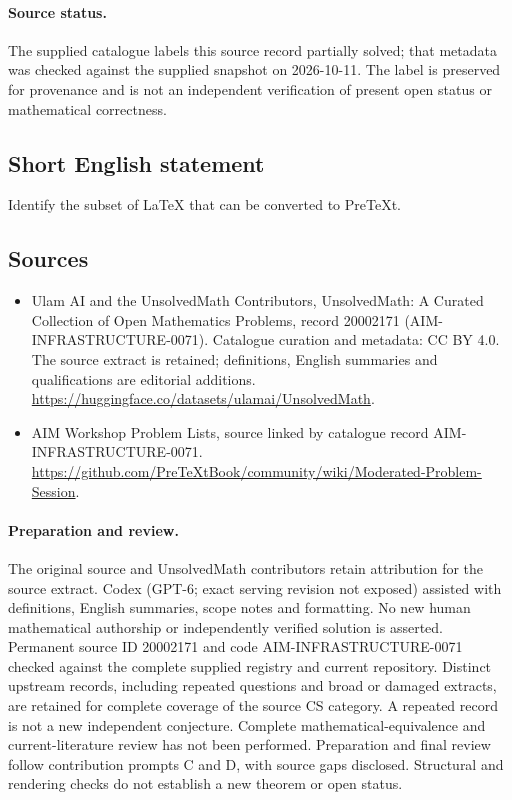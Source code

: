 \documentclass[11pt]{article}
\begin{document}
\paragraph{Source status.}
The supplied catalogue labels this source record partially solved; that metadata was checked against the supplied snapshot on 2026-10-11. The label is preserved for provenance and is not an independent verification of present open status or mathematical correctness.
\subsection{Short English statement}
Identify the subset of LaTeX that can be converted to PreTeXt.
\subsection{Sources}
\begin{itemize}
\item[\hypertarget{source:20002171:1}{S1}] Ulam AI and the UnsolvedMath Contributors, UnsolvedMath: A Curated Collection of Open Mathematics Problems, record 20002171 (AIM-INFRASTRUCTURE-0071). Catalogue curation and metadata: CC BY 4.0. The source extract is retained; definitions, English summaries and qualifications are editorial additions.
\url{https://huggingface.co/datasets/ulamai/UnsolvedMath}.
\item[\hypertarget{source:20002171:2}{S2}] AIM Workshop Problem Lists, source linked by catalogue record AIM-INFRASTRUCTURE-0071.
\url{https://github.com/PreTeXtBook/community/wiki/Moderated-Problem-Session}.
\end{itemize}
\paragraph{Preparation and review.}
The original source and UnsolvedMath contributors retain attribution for the source extract. Codex (GPT-6; exact serving revision not exposed) assisted with definitions, English summaries, scope notes and formatting. No new human mathematical authorship or independently verified solution is asserted. Permanent source ID 20002171 and code AIM-INFRASTRUCTURE-0071 checked against the complete supplied registry and current repository. Distinct upstream records, including repeated questions and broad or damaged extracts, are retained for complete coverage of the source CS category. A repeated record is not a new independent conjecture. Complete mathematical-equivalence and current-literature review has not been performed. Preparation and final review follow contribution prompts C and D, with source gaps disclosed. Structural and rendering checks do not establish a new theorem or open status.
\label{end:20002171}
\end{document}
